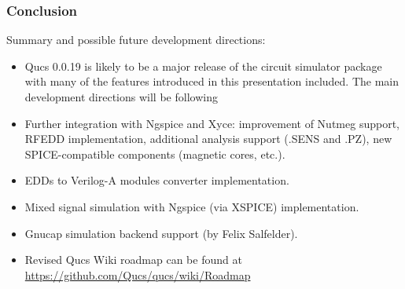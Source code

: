 \documentclass[9pt]{beamer}
\begin{document}
\begin{frame}
 \frametitle{Conclusion}
 
 Summary and possible future development directions:

 \begin{itemize}
  \item Qucs 0.0.19 is likely to be a major release of the circuit simulator 
package with many of the features introduced in this presentation included. The 
main development directions will be following
  \item Further integration with Ngspice and Xyce: improvement of Nutmeg 
support, RFEDD implementation, additional analysis support (.SENS and .PZ), 
new SPICE-compatible components (magnetic cores, etc.).
  \item EDDs to Verilog-A modules converter implementation.
  \item Mixed signal simulation with Ngspice (via XSPICE) implementation.
  \item Gnucap simulation backend support (by Felix Salfelder). 
  \item  Revised Qucs Wiki roadmap can be found at 
\url{https://github.com/Qucs/qucs/wiki/Roadmap}

 \end{itemize}

 
\end{frame}
\end{document}
